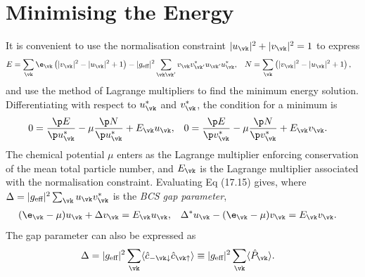 \documentclass[a4paper, 11pt, normalem]{report}
\begin{document}
\section{Minimising the Energy}
It is convenient to use the normalisation constraint $|u_{\vk}|^2+|v_{\vk}|^2=1$ to express
\begin{align}
    E &= \sum_{\vk}\e_{\vk}\left(|v_{\vk}|^2-|u_{\vk}|^2+1\right) - |g_{\text{eff}}|^2\sum_{\vk\vk'}v_{\vk}v_{\vk'}^*u_{\vk'}u_{\vk}^*, & N &= \sum_{\vk}\left(|v_{\vk}|^2-|u_{\vk}|^2+1\right),
\end{align}
and use the method of Lagrange multipliers to find the minimum energy solution.
Differentiating with respect to $u_{\vk}^*$ and $v_{\vk}^*$, the condition for a minimum is
\begin{align}
    0 &= \frac{\p E}{\p u_{\vk}^*} -\mu\frac{\p N}{\p u_{\vk}^*}+E_{\vk}u_{\vk}, & 0 &= \frac{\p E}{\p v_{\vk}^*}-\mu\frac{\p N}{\p v_{\vk}^*}+E_{\vk}v_{\vk}.
\end{align}
The chemical potential $\mu$ enters as the Lagrange multiplier enforcing conservation of the mean total particle number, and $E_{\vk}$ is the Lagrange multiplier associated with the normalisation constraint.
Evaluating Eq (17.15) gives, where $\Delta=|g_{\text{eff}}|^2\sum_{\vk}u_{\vk}v_{\vk}^*$ is the \emph{BCS gap parameter},
\begin{align}
    (\e_{\vk}-\mu)u_{\vk} + \Delta v_{\vk} &= E_{\vk}u_{\vk}, & \Delta^*u_{\vk}-(\e_{\vk}-\mu)v_{\vk} &= E_{\vk}v_{\vk}.
\end{align}
The gap parameter can also be expressed as
\begin{align}
    \Delta &= |g_{\text{eff}}|^2\sum_{\vk}\langle\hat{c}_{-\vk\downarrow}\hat{c}_{\vk\uparrow}\rangle \equiv |g_{\text{eff}}|^2 \sum_{\vk}\langle\hat{P}_{\vk}\rangle.
\end{align}
\end{document}
